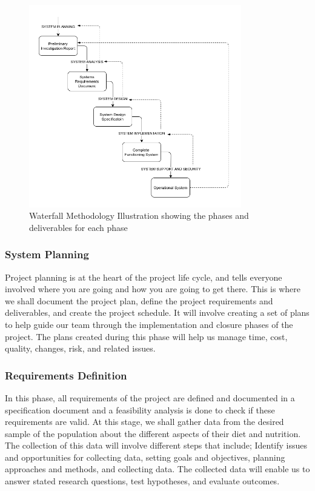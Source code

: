 \documentclass {article}
\begin{document}

\vspace{10px}
\begin{figure}[H]
    \centering
    \includegraphics[width=350px]{Images/waterfall-v3.png}
    \caption{Waterfall Methodology Illustration showing the phases and deliverables for each phase}
    \label{waterfall-SDLC-method-image}
\end{figure}
\vspace{10px}


\subsubsection{System Planning}
\noindent Project planning is at the heart of the project life cycle, and tells everyone involved where you are going and how you are going to get there. This is where we shall document the project plan, define the project requirements and deliverables, and create the project schedule. It will involve creating a set of plans to help guide our team through the implementation and closure phases of the project. The plans created during this phase will help us manage time, cost, quality, changes, risk, and related issues. 

\subsubsection{Requirements Definition}
\noindent In this phase, all requirements of the project are defined and documented in a specification document and a feasibility analysis is done to check if these requirements are valid. At this stage, we shall gather data from the desired sample of the population about the different aspects of their diet and nutrition. The collection of this data will involve different steps that include; Identify issues and opportunities for collecting data, setting goals and objectives, planning approaches and methods, and collecting data. The collected data will enable us to answer stated research questions, test hypotheses, and evaluate outcomes.\\
\end{document}
